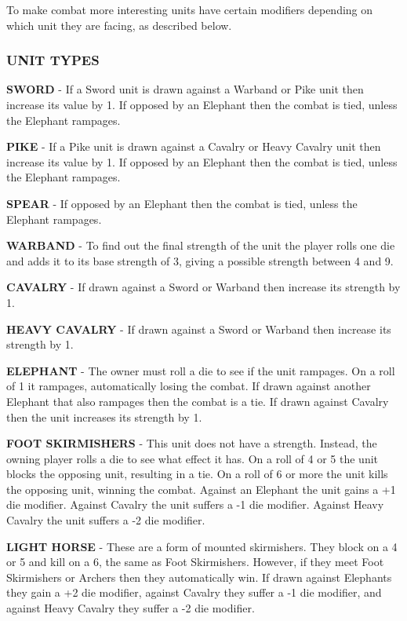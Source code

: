 To make combat more interesting units have certain modifiers depending on which unit they are facing, as described below.

\subsubsection{UNIT TYPES}

\textbf{SWORD} - If a Sword unit is drawn against a Warband or Pike unit then increase its value by 1. If opposed by an Elephant then the combat is tied, unless the Elephant rampages.

\textbf{PIKE} - If a Pike unit is drawn against a Cavalry or Heavy Cavalry unit then increase its value by 1. If opposed by an Elephant then the combat is tied, unless the Elephant rampages.

\textbf{SPEAR} - If opposed by an Elephant then the combat is tied, unless the Elephant rampages.

\textbf{WARBAND} - To find out the final strength of the unit the player rolls one die and adds it to its base strength of 3, giving a possible strength between 4 and 9.

\textbf{CAVALRY} - If drawn against a Sword or Warband then increase its strength by 1.

\textbf{HEAVY CAVALRY} - If drawn against a Sword or Warband then increase its strength by 1.

\textbf{ELEPHANT} - The owner must roll a die to see if the unit rampages. On a roll of 1 it rampages, automatically losing the combat. If drawn against another Elephant that also rampages then the combat is a tie. If drawn against Cavalry then the unit increases its strength by 1.

\textbf{FOOT SKIRMISHERS} - This unit does not have a strength. Instead, the owning player rolls a die to see what effect it has. On a roll of 4 or 5 the unit blocks the opposing unit, resulting in a tie. On a roll of 6 or more the unit kills the opposing unit, winning the combat. Against an Elephant the unit gains a +1 die modifier. Against Cavalry the unit suffers a -1 die modifier. Against Heavy Cavalry the unit suffers a -2 die modifier.

\textbf{LIGHT HORSE} - These are a form of mounted skirmishers. They block on a 4 or 5 and kill on a 6, the same as Foot Skirmishers. However, if they meet Foot Skirmishers or Archers then they automatically win. If drawn against Elephants they gain a +2 die modifier, against Cavalry they suffer a -1 die modifier, and against Heavy Cavalry they suffer a -2 die modifier.

